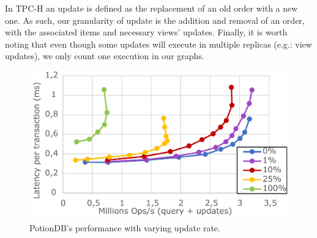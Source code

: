 \documentclass[sigplan,10pt]{acmart}
\begin{document}
In TPC-H an update is defined as the replacement of an old order with a new one.
As such, our granularity of update is the addition and removal of an order, with the associated items and necessary views' updates.
Finally, it is worth noting that even though some updates will execute in multiple replicas (e.g.: view updates), we only count one execution in our graphs.

\begin{figure}
	\centering
	\includegraphics[width=.75\linewidth]{updRate_global_cut}
	\caption{PotionDB's performance with varying update rate.}
	\label{fig:update_rates}
\end{figure}
\end{document}
